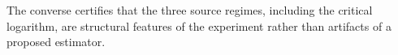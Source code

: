 The converse certifies that the three source regimes, including the critical logarithm, are structural features of the experiment rather than artifacts of a proposed estimator.